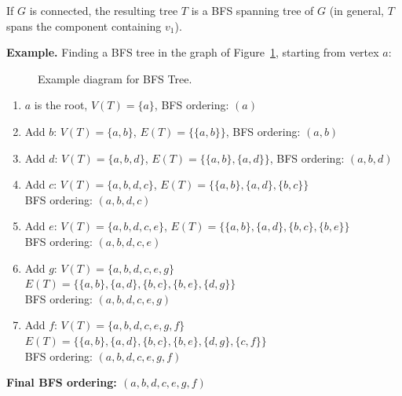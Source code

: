 \documentclass{article}
\theoremstyle{definition}
\begin{document}
If $G$ is connected, the resulting tree $T$ is a BFS spanning tree of $G$ (in general, $T$ spans the component containing $v_1$).

\noindent\textbf{Example.}
Finding a BFS tree in the graph of Figure~\ref{fig:graph-example1}, starting from vertex $a$:
\begin{figure}[h]
\centering
{}
\caption{Example diagram for BFS Tree.}
\label{fig:graph-example1}
\end{figure}

\begin{enumerate}
\item $a$ is the root, $V(T) = \{a\}$, BFS ordering: $(a)$
\item Add $b$: $V(T) = \{a, b\}$, $E(T) = \{\{a, b\}\}$, BFS ordering: $(a, b)$
\item Add $d$: $V(T) = \{a, b, d\}$, $E(T) = \{\{a, b\}, \{a, d\}\}$, BFS ordering: $(a, b, d)$
\item Add $c$: $V(T) = \{a, b, d, c\}$, $E(T) = \{\{a, b\}, \{a, d\}, \{b, c\}\}$\\
   BFS ordering: $(a, b, d, c)$
\item Add $e$: $V(T) = \{a, b, d, c, e\}$, $E(T) = \{\{a, b\}, \{a, d\}, \{b, c\}, \{b, e\}\}$\\
   BFS ordering: $(a, b, d, c, e)$
\item Add $g$: $V(T) = \{a, b, d, c, e, g\}$\\
   $E(T) = \{\{a, b\}, \{a, d\}, \{b, c\}, \{b, e\}, \{d, g\}\}$\\
   BFS ordering: $(a, b, d, c, e, g)$
\item Add $f$: $V(T) = \{a, b, d, c, e, g, f\}$\\
   $E(T) = \{\{a, b\}, \{a, d\}, \{b, c\}, \{b, e\}, \{d, g\}, \{c, f\}\}$\\
   BFS ordering: $(a, b, d, c, e, g, f)$
\end{enumerate}
\textbf {Final BFS ordering: $(a, b, d, c, e, g, f)$}
\end{document}

